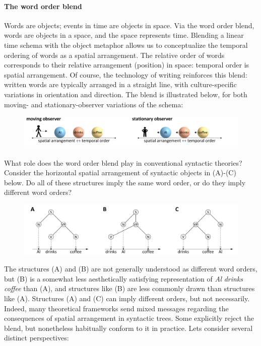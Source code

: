 \paragraph{The word order blend}

Words are objects; events in time are objects in space. Via the word order blend, words are objects in a space, and the space represents time. Blending a linear time schema with the object metaphor allows us to conceptualize the temporal ordering of words as a spatial arrangement. The relative order of words corresponds to their relative arrangement (position) in space: temporal order is spatial arrangement. Of course, the technology of writing reinforces this blend: written words are typically arranged in a straight line, with culture-specific variations in orientation and direction. The blend is illustrated below, for both moving- and stationary-observer variations of the schema:

  
\begin{figure}
\includegraphics[width=\textwidth]{figures/Tilsen-img39.png}
\caption{\missingcaption}
\label{fig:}
\end{figure}
 

  What role does the word order blend play in conventional syntactic theories? Consider the horizontal spatial arrangement of syntactic objects in (A)-(C) below. Do all of these structures imply the same word order, or do they imply different word orders?

  
\begin{figure}
\includegraphics[width=\textwidth]{figures/Tilsen-img40.png}
\caption{\missingcaption}
\label{fig:}
\end{figure}
 

  The structures (A) and (B) are not generally understood as different word orders, but (B) is a somewhat less aesthetically satisfying representation of \textit{Al} \textit{drinks} \textit{coffee} than (A), and structures like (B) are less commonly drawn than structures like (A). Structures (A) and (C) can imply different orders, but not necessarily. Indeed, many theoretical frameworks send mixed messages regarding the consequences of spatial arrangement in syntactic trees. Some explicitly reject the blend, but nonetheless habitually conform to it in practice. Lets consider several distinct perspectives:

